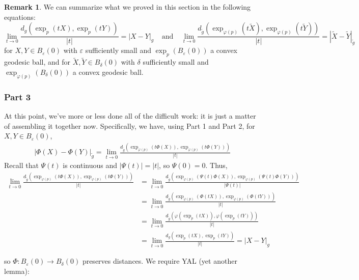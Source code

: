 \documentclass[aps,pra,showpacs,notitlepage,onecolumn,superscriptaddress,nofootinbib]{revtex4-1}
\theoremstyle{definition}
\newtheorem{remark}{Remark}[section]
\newcommand{\hhrulefill}{\hspace{-1.5em} \hrulefill}
\begin{document}
\begin{remark}
  We can summarize what we proved in this section in the following equations:
  \begin{equation}
    \lim_{t \to 0} \frac{d_g(\exp_p(tX), \exp_p(tY))}{|t|} = |X - Y|_g \ \ \ \ \ \text{and} \ \ \ \ \ \lim_{t \to 0} \frac{d_{\widetilde{g}}(\exp_{\varphi(p)}(t\widetilde{X}), \exp_{\varphi(p)}(t\widetilde{Y}))}{|t|} = |\widetilde{X} - \widetilde{Y}|_{\widetilde{g}}
  \end{equation}
  for $X, Y \in B_{\varepsilon}(0)$ with $\varepsilon$ sufficiently small and $\exp_p(B_{\varepsilon}(0))$ a convex geodesic ball, and for $\widetilde{X}, \widetilde{Y} \in B_{\delta}(0)$ with $\delta$ sufficiently small and $\exp_{\varphi(p)}(B_{\delta}(0))$
  a convex geodesic ball.
  \end{remark}

    \hhrulefill

    \subsubsection{Part 3}

    \noindent At this point, we've more or less done all of the difficult work: it is just a matter of assembling it together now. Specifically, we have, using Part 1 and Part 2, for $X, Y \in B_{\varepsilon}(0)$,
    \begin{align}
      |\Phi(X) - \Phi(Y)|_{\widetilde{g}} = \lim_{t \to 0} \frac{d_{\widetilde{g}}(\exp_{\varphi(p)}(t\Phi(X)), \exp_{\varphi(p)}(t\Phi(Y)))}{|t|}
    \end{align}
    Recall that $\Psi(t)$ is continuous and $|\Psi(t)| = |t|$, so $\Psi(0) = 0$. Thus,
    \begin{align}
      \lim_{t \to 0} \frac{d_{\widetilde{g}}(\exp_{\varphi(p)}(t\Phi(X)), \exp_{\varphi(p)}(t\Phi(Y)))}{|t|} &= \lim_{t \to 0} \frac{d_{\widetilde{g}}(\exp_{\varphi(p)}(\Psi(t)\Phi(X)), \exp_{\varphi(p)}(\Psi(t)\Phi(Y)))}{|\Psi(t)|}
      \\ &= \lim_{t \to 0} \frac{d_{\widetilde{g}}(\exp_{\varphi(p)}(\Phi(tX)), \exp_{\varphi(p)}(\Phi(tY)))}{|t|}
      \\ &= \lim_{t \to 0} \frac{d_{\widetilde{g}}(\varphi(\exp_{p}(tX)), \varphi(\exp_{p}(tY)))}{|t|}
      \\ &= \lim_{t \to 0} \frac{d_{g}(\exp_{p}(tX), \exp_{p}(tY))}{|t|} = |X - Y|_g
      \end{align}

    \noindent so $\Phi : B_{\varepsilon}(0) \rightarrow B_{\delta}(0)$ preserves distances. We require YAL (yet another lemma):
\end{document}
